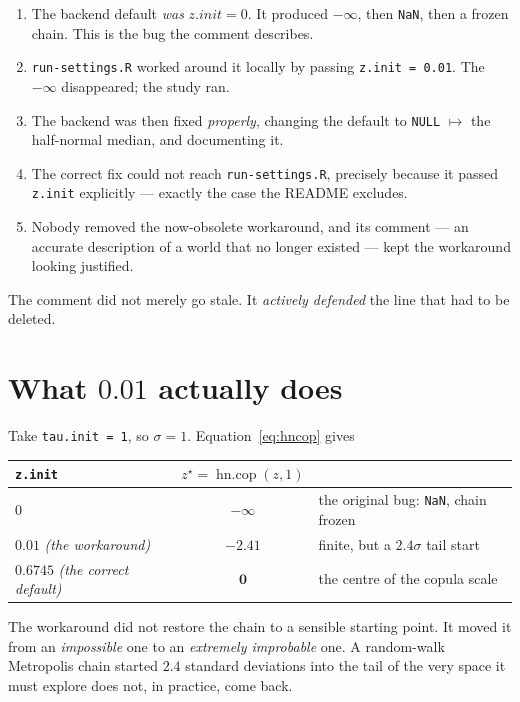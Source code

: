 \documentclass[11pt]{article}
\newcommand{\code}[1]{\texttt{#1}}
\begin{document}
\begin{enumerate}\itemsep2pt
  \item The backend default \emph{was} $z.init = 0$. It produced $-\infty$, then
        \code{NaN}, then a frozen chain. This is the bug the comment describes.
  \item \code{run-settings.R} worked around it locally by passing
        \code{z.init = 0.01}. The $-\infty$ disappeared; the study ran.
  \item The backend was then fixed \emph{properly}, changing the default to
        \code{NULL} $\mapsto$ the half-normal median, and documenting it.
  \item The correct fix could not reach \code{run-settings.R}, precisely because
        it passed \code{z.init} explicitly --- exactly the case the README
        excludes.
  \item Nobody removed the now-obsolete workaround, and its comment --- an
        accurate description of a world that no longer existed --- kept the
        workaround looking justified.
\end{enumerate}

The comment did not merely go stale. It \emph{actively defended} the line that
had to be deleted.

\section{What $0.01$ actually does}

Take \code{tau.init = 1}, so $\sigma = 1$. Equation~\eqref{eq:hncop} gives

\begin{center}
\begin{tabular}{lcl}
\toprule
\code{z.init} & $z^\star = \operatorname{hn.cop}(z,1)$ & \\
\midrule
$0$                      & $-\infty$ & the original bug: \code{NaN}, chain frozen \\
$0.01$ \emph{(the workaround)} & $\mathbf{-2.41}$ & finite, but a $2.4\sigma$ tail start \\
$0.6745$ \emph{(the correct default)} & $\mathbf{0}$ & the centre of the copula scale \\
\bottomrule
\end{tabular}
\end{center}

The workaround did not restore the chain to a sensible starting point. It moved
it from an \emph{impossible} one to an \emph{extremely improbable} one. A
random-walk Metropolis chain started $2.4$ standard deviations into the tail of
the very space it must explore does not, in practice, come back.
\end{document}
